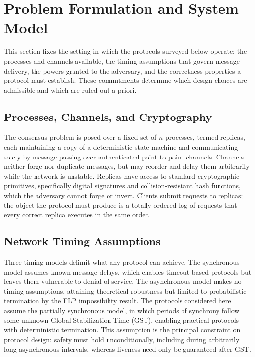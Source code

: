 \section{Problem Formulation and System Model}

This section fixes the setting in which the protocols surveyed below operate: the processes and channels available, the timing assumptions that govern message delivery, the powers granted to the adversary, and the correctness properties a protocol must establish. These commitments determine which design choices are admissible and which are ruled out a priori.

\subsection{Processes, Channels, and Cryptography}

The consensus problem is posed over a fixed set of $n$ processes, termed replicas, each maintaining a copy of a deterministic state machine and communicating solely by message passing over authenticated point-to-point channels. Channels neither forge nor duplicate messages, but may reorder and delay them arbitrarily while the network is unstable. Replicas have access to standard cryptographic primitives, specifically digital signatures and collision-resistant hash functions, which the adversary cannot forge or invert. Clients submit requests to replicas; the object the protocol must produce is a totally ordered log of requests that every correct replica executes in the same order.

\subsection{Network Timing Assumptions}

Three timing models delimit what any protocol can achieve. The synchronous model assumes known message delays, which enables timeout-based protocols but leaves them vulnerable to denial-of-service. The asynchronous model makes no timing assumptions, attaining theoretical robustness but limited to probabilistic termination by the FLP impossibility result. The protocols considered here assume the partially synchronous model, in which periods of synchrony follow some unknown Global Stabilization Time (GST), enabling practical protocols with deterministic termination. This assumption is the principal constraint on protocol design: safety must hold unconditionally, including during arbitrarily long asynchronous intervals, whereas liveness need only be guaranteed after GST.

